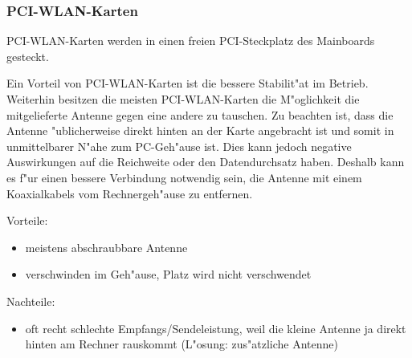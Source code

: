 \subsubsection{PCI-WLAN-Karten}

PCI-WLAN-Karten werden in einen freien PCI-Steckplatz des Mainboards
gesteckt.

Ein Vorteil von PCI-WLAN-Karten ist die bessere Stabilit"at im
Betrieb. Weiterhin besitzen die meisten PCI-WLAN-Karten die M"oglichkeit
die mitgelieferte Antenne gegen eine andere zu tauschen. Zu beachten ist,
dass die Antenne "ublicherweise direkt hinten an der Karte angebracht
ist und somit in unmittelbarer N"ahe zum PC-Geh"ause ist. Dies kann
jedoch negative Auswirkungen auf die Reichweite oder den Datendurchsatz
haben. Deshalb kann es f"ur einen bessere Verbindung notwendig sein,
die Antenne mit einem Koaxialkabels vom Rechnergeh"ause zu entfernen.

Vorteile:
\begin{itemize}
\item meistens abschraubbare Antenne
\item verschwinden im Geh"ause, Platz wird nicht verschwendet 
\end{itemize}

Nachteile:
\begin{itemize}
\item oft recht schlechte Empfangs/Sendeleistung, weil die kleine Antenne
ja direkt hinten am Rechner rauskommt (L"osung: zus"atzliche Antenne)
\end{itemize}

